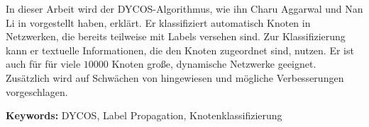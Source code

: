 In dieser Arbeit wird der DYCOS-Algorithmus, wie ihn Charu Aggarwal
und Nan Li in \cite{aggarwal2011} vorgestellt haben, erklärt.
Er klassifiziert automatisch Knoten in 
Netzwerken, die bereits teilweise mit Labels versehen sind. Zur 
Klassifizierung kann er textuelle Informationen, die den Knoten 
zugeordnet sind, nutzen. Er ist auch für für viele $\num{10000}$ 
Knoten große, dynamische Netzwerke geeignet.\\
Zusätzlich wird auf Schwächen von \cite{aggarwal2011} hingewiesen
und mögliche Verbesserungen vorgeschlagen.

\textbf{Keywords:} DYCOS, Label Propagation, Knotenklassifizierung

